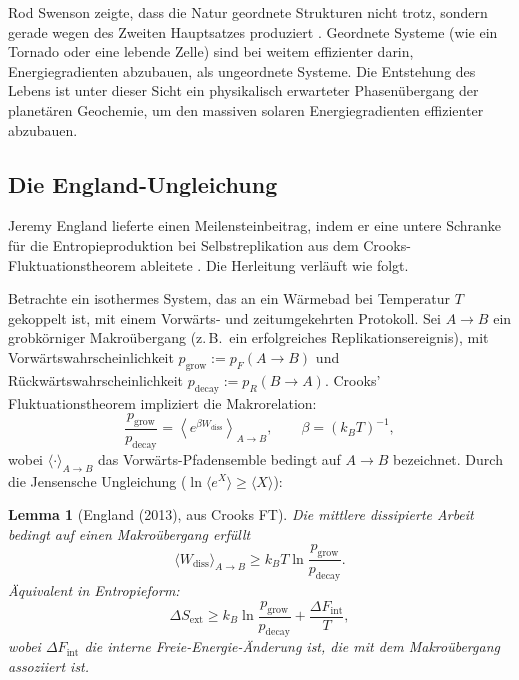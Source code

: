 \documentclass[12pt,a4paper]{article}
\newtheorem{lemma}{Lemma}
\theoremstyle{remark}
\begin{document}
Rod Swenson zeigte, dass die Natur geordnete Strukturen nicht trotz, sondern gerade wegen des Zweiten Hauptsatzes produziert \citep{ThermodynamicsLife}. Geordnete Systeme (wie ein Tornado oder eine lebende Zelle) sind bei weitem effizienter darin, Energiegradienten abzubauen, als ungeordnete Systeme. Die Entstehung des Lebens ist unter dieser Sicht ein physikalisch erwarteter Phasen\"ubergang der planet\"aren Geochemie, um den massiven solaren Energiegradienten effizienter abzubauen.

\subsection{Die England-Ungleichung}

Jeremy England lieferte einen Meilensteinbeitrag, indem er eine untere Schranke f\"ur die Entropieproduktion bei Selbstreplikation aus dem Crooks-Fluktuationstheorem ableitete \citep{England2013}. Die Herleitung verl\"auft wie folgt.

Betrachte ein isothermes System, das an ein W\"armebad bei Temperatur $T$ gekoppelt ist, mit einem Vorw\"arts- und zeitumgekehrten Protokoll. Sei $A \to B$ ein grobk\"orniger Makro\"ubergang (z.\,B.\ ein erfolgreiches Replikationsereignis), mit Vorw\"artswahrscheinlichkeit $p_{\mathrm{grow}} := p_F(A \to B)$ und R\"uckw\"artswahrscheinlichkeit $p_{\mathrm{decay}} := p_R(B \to A)$. Crooks' Fluktuationstheorem impliziert die Makrorelation:
\begin{equation}
\frac{p_{\mathrm{grow}}}{p_{\mathrm{decay}}} = \left\langle e^{\beta W_{\mathrm{diss}}} \right\rangle_{A \to B}, \qquad \beta = (k_B T)^{-1},
\end{equation}
wobei $\langle \cdot \rangle_{A \to B}$ das Vorw\"arts-Pfadensemble bedingt auf $A \to B$ bezeichnet. Durch die Jensensche Ungleichung ($\ln \langle e^X \rangle \geq \langle X \rangle$):

\begin{lemma}[England (2013), aus Crooks FT]
\label{lem:england}
Die mittlere dissipierte Arbeit bedingt auf einen Makro\"ubergang erf\"ullt
\begin{equation}
\langle W_{\mathrm{diss}} \rangle_{A \to B} \geq k_B T \ln \frac{p_{\mathrm{grow}}}{p_{\mathrm{decay}}}.
\end{equation}
\"Aquivalent in Entropieform:
\begin{equation}
\Delta S_{\mathrm{ext}} \geq k_B \ln \frac{p_{\mathrm{grow}}}{p_{\mathrm{decay}}} + \frac{\Delta F_{\mathrm{int}}}{T},
\end{equation}
wobei $\Delta F_{\mathrm{int}}$ die interne Freie-Energie-\"Anderung ist, die mit dem Makro\"ubergang assoziiert ist.
\end{lemma}
\end{document}
